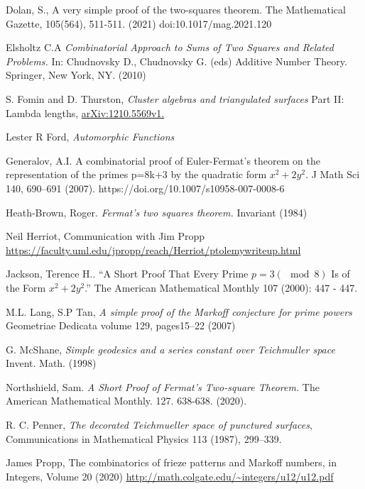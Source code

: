 \documentclass[12pt,a4paper]{amsart}
\begin{document}
Dolan, S., A very simple proof of the two-squares theorem. The Mathematical Gazette, 105(564), 511-511. (2021) doi:10.1017/mag.2021.120

Elsholtz C.A 
\textit{Combinatorial Approach to Sums of Two Squares and Related Problems.}
 In: Chudnovsky D., Chudnovsky G. (eds) Additive Number Theory. Springer, New York, NY.
 (2010) 

S. Fomin and D. Thurston,
\textit{Cluster algebras and triangulated surfaces}
Part II: Lambda lengths, \url{arXiv:1210.5569v1.}

Lester R Ford,
\textit{Automorphic Functions}

Generalov, A.I. A combinatorial proof of Euler-Fermat’s theorem on the representation of the primes p=8k+3 by the quadratic form $x^2 + 2y^2$. J Math Sci 140, 690–691 (2007). https://doi.org/10.1007/s10958-007-0008-6

Heath-Brown, Roger. 
\textit{ Fermat’s two squares theorem.} Invariant (1984) 

Neil Herriot, Communication with Jim Propp
\url{https://faculty.uml.edu/jpropp/reach/Herriot/ptolemywriteup.html}

Jackson, Terence H.. “A Short Proof That Every Prime $p = 3 (\mod 8)$
Is of the Form $x^2 + 2y^2$.” The American Mathematical Monthly 107 (2000): 447 - 447.


M.L. Lang, S.P Tan,
\textit{A simple proof of the Markoff conjecture for prime powers}
Geometriae Dedicata volume 129, pages15–22 (2007)


G. McShane,
\textit{Simple geodesics and a series constant over Teichmuller space}
Invent. Math. (1998)


Northshield, Sam. 
\textit{A Short Proof of Fermat’s Two-square Theorem.} The American Mathematical Monthly. 127. 638-638. (2020). 


R. C. Penner, 
\textit{The decorated Teichmueller space of punctured surfaces}, 
Communications in Mathematical Physics 113 (1987), 299–339.


James Propp,
The combinatorics of frieze patterns and Markoff numbers,
in  Integers, Volume 20 (2020)
\url{http://math.colgate.edu/~integers/u12/u12.pdf}
\end{document}
